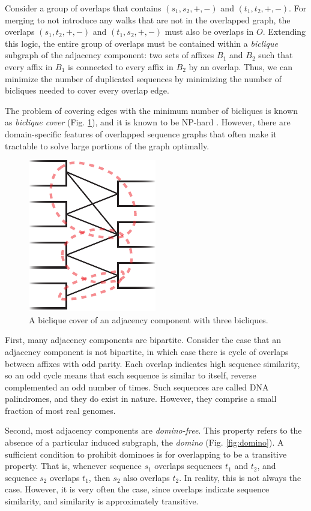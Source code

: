 \documentclass[11pt]{ucthesis}
\newcommand{\figref}[1]{Fig. \ref{fig:#1}}
\begin{document}
Consider a group of overlaps that contains $(s_1, s_2, +, -)$ and $(t_1, t_2, +, -)$.
For merging to not introduce any walks that are not in the overlapped graph, the overlaps $(s_1, t_2, +, -)$ and $(t_1, s_2, +, -)$ must also be overlaps in $O$.
Extending this logic, the entire group of overlaps must be contained within a \emph{biclique} subgraph of the adjacency component: two sets of affixes $B_1$ and $B_2$ such that every affix in $B_1$ is connected to every affix in $B_2$ by an overlap.
Thus, we can minimize the number of duplicated sequences by minimizing the number of bicliques needed to cover every overlap edge.

The problem of covering edges with the minimum number of bicliques is known as \emph{biclique cover} (\figref{biclique}), and it is known to be NP-hard \cite{orlin1977contentment}.
However, there are domain-specific features of overlapped sequence graphs that often make it tractable to solve large portions of the graph optimally.

\begin{figure}
\begin{center}
\includegraphics[width=.2\textwidth]{bluntfigures/biclique_cover.pdf}
\caption{A biclique cover of an adjacency component with three bicliques.} \label{fig:biclique}
\end{center}
\end{figure}

First, many adjacency components are bipartite.
Consider the case that an adjacency component is not bipartite, in which case there is cycle of overlaps between affixes with odd parity.
Each overlap indicates high sequence similarity, so an odd cycle means that each sequence is similar to itself, reverse complemented an odd number of times.
Such sequences are called DNA palindromes, and they do exist in nature.
However, they comprise a small fraction of most real genomes.

Second, most adjacency components are \emph{domino-free}. 
This property refers to the absence of a particular induced subgraph, the \emph{domino} (\figref{domino}).
A sufficient condition to prohibit dominoes is for overlapping to be a transitive property.
That is, whenever sequence $s_1$ overlaps sequences $t_1$ and $t_2$, and sequence $s_2$ overlaps $t_1$, then $s_2$ also overlaps $t_2$.
In reality, this is not always the case.
However, it is very often the case, since overlaps indicate sequence similarity, and similarity is approximately transitive.
    
\end{document}
